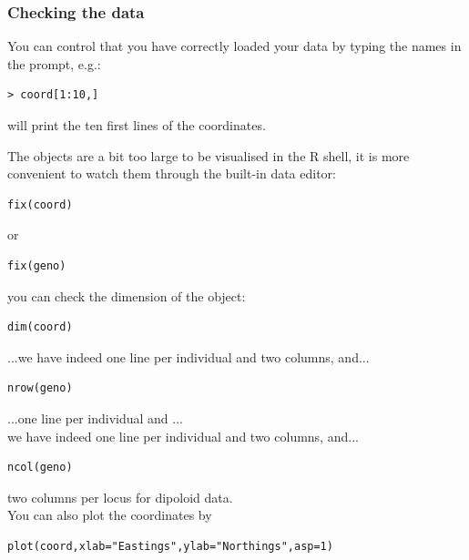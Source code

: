 \documentclass[a4paper,10pt]{article}
\begin{document}
\subsubsection{Checking the data}
You can control that you have correctly loaded your data by typing the names in the prompt, e.g.:

\begin{verbatim}
> coord[1:10,]
\end{verbatim}



will print the ten first lines of the coordinates.

The objects are a bit too large to be visualised in the R shell, it is more convenient to watch them through the built-in data editor:

\begin{verbatim}
fix(coord)
\end{verbatim}



or 

\begin{verbatim}
fix(geno)
\end{verbatim}



you can check the dimension of the object:

\begin{verbatim}
dim(coord)
\end{verbatim}



...we have indeed one line per individual and two columns, and...

\begin{verbatim}
nrow(geno)
\end{verbatim}



...one line per individual and ...\\

we have indeed one line per individual and two columns, and...

\begin{verbatim}
ncol(geno)
\end{verbatim}



two columns per locus for dipoloid data.\\


You can also plot the coordinates by 

\begin{verbatim}
plot(coord,xlab="Eastings",ylab="Northings",asp=1)
\end{verbatim}
\end{document}
